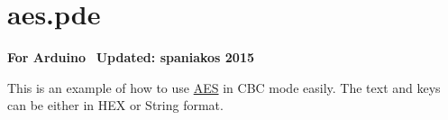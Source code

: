 \hypertarget{aes_8pde-example}{}\section{aes.\+pde}
{\bfseries For Arduino}~\newline
 {\bfseries Updated\+: spaniakos 2015 }~\newline


This is an example of how to use \hyperlink{classAES}{A\+ES} in C\+BC mode easily. The text and keys can be either in H\+EX or String format.~\newline



\begin{DoxyCodeInclude}
\end{DoxyCodeInclude}
 